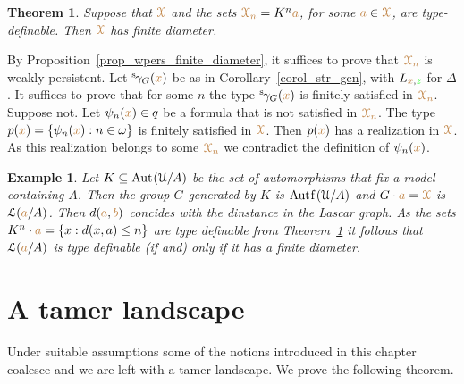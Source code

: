 \documentclass[10pt,openany]{amsproc}
\makeatletter
\def\Aut{{\rm Aut\kern.15ex}}
\def\Autf{\mathord{\rm Aut\kern.15ex{f}\kern.15ex}}
\def\X{\EuScript X}
\def\U{\EuScript U}
\def\Ll{\EuScript L}
\def\<{\langle}
\def\>{\rangle}
\newcounter{thm}
\theoremstyle{mio}
\newtheorem{theorem}[thm]{Theorem}\tcolorboxenvironment{theorem}{mythm}
\newtheorem{example}[thm]{Example}\tcolorboxenvironment{example}{mythm}
\providecommand{\proofNameStyle}{\bfseries}
\renewenvironment{proof}[1][\proofname]{\par
  \pushQED{\qed}%
  \normalfont%
  \trivlist
  \item[\hskip\labelsep
        \proofNameStyle
    #1\@addpunct{.}]\ignorespaces
}{%
  \popQED\endtrivlist\@endpefalse
}
\def\mr{\color{brown}}
\def\gr{\color{green}}
\def\mrX{{\mr\X}}
\makeatother
\begin{document}
\begin{theorem}\label{thm_newelski}
  Suppose that $\mrX$ and the sets ${\mr\X_n}=K^n{\mr a}$, for some ${\mr a}\in\mrX$, are type-definable.
  Then $\mrX$ has finite diameter.
\end{theorem}

\begin{proof}
  By Proposition~\ref{prop_wpers_finite_diameter}, it suffices to prove that ${\mr\X_n}$ is weakly persistent.
  Let ${}^{\rm s}\kern-.2ex\gamma_G({\mr x})$ be as in Corollary~\ref{corol_str_gen}, with $L_{{\mr x},{\gr z}}$ for $\Delta$.
  It suffices to prove that for some $n$ the type ${}^{\rm s}\kern-.2ex\gamma_G({\mr x})$ is finitely satisfied in $\mr\X_n$.
  Suppose not.
  Let $\psi_n({\mr x})\in q$ be a formula that is not satisfied in $\mr\X_n$.
  The type $p({\mr x})=\{\psi_n({\mr x}):n\in\omega\}$ is finitely satisfied in $\mrX$.
  Then $p({\mr x})$ has a realization in $\mrX$. 
  As this realization belongs to some ${\mr\X_n}$ we contradict the definition of $\psi_n({\mr x})$. 
\end{proof}



\begin{example}\label{ex_newelski}
  Let $K\subseteq\Aut(\U/A)$ be the set of automorphisms that fix a model containing $A$.
  Then the group $G$  generated by $K$ is $\Autf(\U/A)$ and $G\cdot{\mr a}=\mrX$ is $\Ll({\mr a}/A)$.
  Then $d({\mr a},{\mr b})$ concides with the dinstance in the Lascar graph.
  As the sets $K^n\cdot{\mr a}=\{x:d(x,a)\le n\}$ are type definable from Theorem~\ref{thm_newelski} it follows that $\Ll({\mr a}/A)$ is type definable (if and) only if it has a finite diameter.
\end{example} 

\section{A tamer landscape}

Under suitable assumptions some of the notions introduced in this chapter coalesce and we are left with a tamer landscape.
We prove the following theorem.
\end{document}
